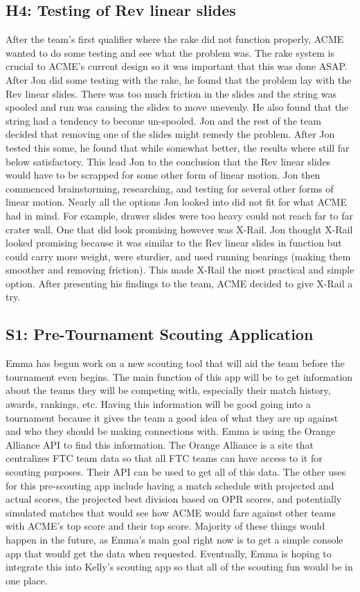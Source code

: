 \documentclass{article}
\begin{document}
\subsection{H4: Testing of Rev linear slides}

After the team's first qualifier where the rake did not function properly, ACME wanted to do some testing and see what the problem was. The rake system is crucial to ACME's current design so it was important that this was done ASAP. After Jon did some testing with the rake, he found that the problem lay with the Rev linear slides. There was too much friction in the slides and the string was spooled and run was causing the slides to move unevenly. He also found that the string had a tendency to become un-spooled. Jon and the rest of the team decided that removing one of the slides might remedy the problem. After Jon tested this some, he found that while somewhat better, the results where still far below satisfactory. This lead Jon to the conclusion that the Rev linear slides would have to be scrapped for some other form of linear motion. Jon then commenced brainstorming, researching, and testing for several other forms of linear motion. Nearly all the options Jon looked into did not fit for what ACME had in mind. For example, drawer slides were too heavy could not reach far to far crater wall. One that did look promising however was X-Rail. Jon thought X-Rail looked promising because it was similar to the Rev linear slides in function but could carry more weight, were sturdier, and used running bearings (making them smoother and removing friction). This made X-Rail the most practical and simple option. After presenting his findings to the team, ACME decided to give X-Rail a try. 
\subsection{S1: Pre-Tournament Scouting Application}

Emma has begun work on a new scouting tool that will aid the team before the tournament even begins. The main function of this app will be to get information about the teams they will be competing with, especially their match history, awards, rankings, etc. Having this information will be good going into a tournament because it gives the team a good idea of what they are up against and who they should be making connections with. Emma is using the Orange Alliance API to find this information. The Orange Alliance is a site that centralizes FTC team data so that all FTC teams can have access to it for scouting purposes. Their API can be used to get all of this data. The other uses for this pre-scouting app include having a match schedule with projected and actual scores, the projected best division based on OPR scores, and potentially simulated matches that would see how ACME would fare against other teams with ACME's top score and their top score. Majority of these things would happen in the future, as Emma's main goal right now is to get a simple console app that would get the data when requested. Eventually, Emma is hoping to integrate this into Kelly's scouting app so that all of the scouting fun would be in one place. 
\end{document}
